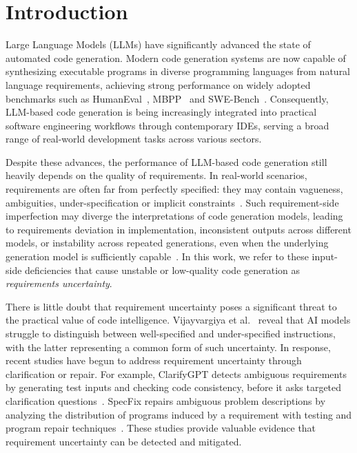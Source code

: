 \section{Introduction}
\label{sec:intro}

Large Language Models (LLMs) have significantly advanced the state of automated code generation. Modern code generation systems are now capable of synthesizing executable programs in diverse programming languages from natural language requirements, achieving strong performance on widely adopted benchmarks such as HumanEval~\cite{humaneval}, MBPP~\cite{mbpp} and SWE-Bench~\cite{jimenez2024swebench}. Consequently, LLM-based code generation is being increasingly integrated into practical software engineering workflows through contemporary IDEs, serving a broad range of real-world development tasks across various sectors.

Despite these advances, the performance of LLM-based code generation still heavily depends on the quality of requirements. In real-world scenarios, requirements are often far from perfectly specified: they may contain vagueness, ambiguities, under-specification or implicit constraints~\cite{abdeahad2026accurate, ezzini2022anaphoric}. Such requirement-side imperfection may diverge the interpretations of code generation models, leading to requirements deviation in implementation, inconsistent outputs across different models, or instability across repeated generations, even when the underlying generation model is sufficiently capable~\cite{yang2026assessingimpactrequirementambiguity, 10554837}. In this work, we refer to these input-side deficiencies that cause unstable or low-quality code generation as \textit{requirements uncertainty}.

There is little doubt that requirement uncertainty poses a significant threat to the practical value of code intelligence.  Vijayvargiya et al.~\cite{vijayvargiya2026ambigsweinteractiveagentsovercome} reveal that AI models struggle to distinguish between well-specified and under-specified instructions, with the latter representing a common form of such uncertainty. In response, recent studies have begun to address requirement uncertainty through clarification or repair. For example, ClarifyGPT detects ambiguous requirements by generating test inputs and checking code consistency, before it asks targeted clarification questions~\cite{mu2024clarifygpt}. SpecFix repairs ambiguous problem descriptions by analyzing the distribution of programs induced by a requirement with testing and program repair techniques~\cite{jia2025specfix}. These studies provide valuable evidence that requirement uncertainty can be detected and mitigated.

